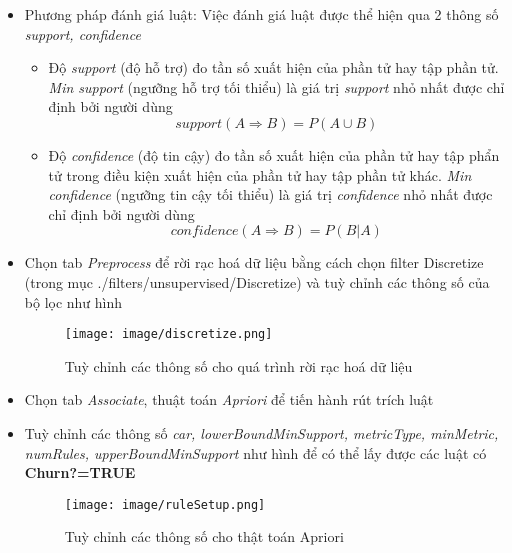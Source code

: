 \documentclass[a4paper, 12pt]{article}
\begin{document}
\begin{itemize}
    \item Phương pháp đánh giá luật: Việc đánh giá luật được thể hiện qua 2 thông số \textit{support, confidence}
    \begin{itemize}
        \item Độ \textit{support} (độ hỗ trợ) đo tần số xuất hiện của phần tử hay tập phần tử. \textit{Min support} (ngưỡng hỗ trợ tối thiểu) là giá trị \textit{support} nhỏ nhất được chỉ định bởi người dùng $$support(A \Rightarrow B) = P(A \cup B)$$
        \item Độ \textit{confidence} (độ tin cậy) đo tần số xuất hiện của phần tử hay tập phẩn tử trong điều kiện xuất hiện của phần tử hay tập phần tử khác. \textit{Min confidence} (ngưỡng tin cậy tối thiểu) là giá trị \textit{confidence} nhỏ nhất được chỉ định bởi người dùng $$confidence(A \Rightarrow B) = P(B|A)$$
    \end{itemize}

    \item Chọn tab \textit{Preprocess} để rời rạc hoá dữ liệu bằng cách chọn filter Discretize (trong mục ./filters/unsupervised/Discretize) và tuỳ chỉnh các thông số của bộ lọc như hình
    \begin{figure}[H]
        \begin{center}
            \texttt{[image: image/discretize.png]}
            \caption{Tuỳ chỉnh các thông số cho quá trình rời rạc hoá dữ liệu}
        \end{center}
    \end{figure}

    \item Chọn tab \textit{Associate}, thuật toán \textit{Apriori} để tiến hành rút trích luật
    \item Tuỳ chỉnh các thông số \textit{car, lowerBoundMinSupport, metricType, minMetric, numRules, upperBoundMinSupport} như hình để có thể lấy được các luật có \textbf{Churn?=TRUE}
    \begin{figure}[H]
        \begin{center}
            \texttt{[image: image/ruleSetup.png]}
            \caption{Tuỳ chỉnh các thông số cho thật toán Apriori}
        \end{center}
    \end{figure}
    

\end{itemize}
\end{document}
